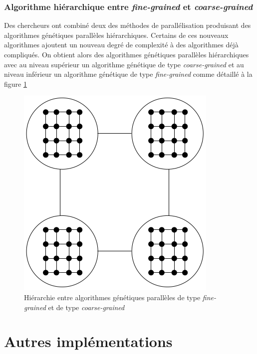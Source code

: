 \documentclass[12pt,a4paper]{article}
\begin{document}
	\subsubsection{Algorithme hiérarchique entre \emph{fine-grained} et \emph{coarse-grained}}
	Des chercheurs ont combiné deux des méthodes de parallélisation produisant des algorithmes génétiques parallèles hiérarchiques. Certains de ces nouveaux algorithmes ajoutent un nouveau degré de complexité à des algorithmes déjà compliqués. On obtient alors des algorithmes génétiques parallèles hiérarchiques avec au niveau supérieur un algorithme génétique de type \emph{coarse-grained} et au niveau inférieur un algorithme génétique de type \emph{fine-grained} comme détaillé à la figure \ref{fig:hierar_fine_grained_fig}
	
	\begin{figure}[!h]
		\begin{center}
			\includegraphics[scale=.3]{img/hierar_fine_grained_fig.png}
			\caption{Hiérarchie entre algorithmes génétiques parallèles de type \emph{fine-grained} et de type \emph{coarse-grained}}
			\label{fig:hierar_fine_grained_fig}
		\end{center}
	\end{figure} 
	\section{Autres implémentations}
\end{document}
